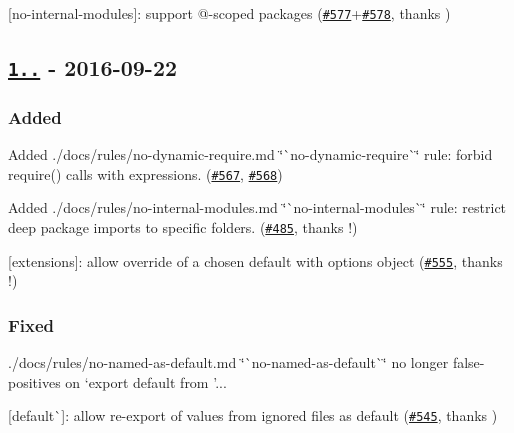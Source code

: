 \begin{DoxyItemize}
\item \mbox{[}{\ttfamily no-\/internal-\/modules}\mbox{]}\+: support {\ttfamily @}-\/scoped packages (\href{https://github.com/benmosher/eslint-plugin-import/issues/577}{\tt \#577}+\href{https://github.com/benmosher/eslint-plugin-import/pull/578}{\tt \#578}, thanks \href{https://github.com/spalger}{\tt })
\end{DoxyItemize}

\subsection*{\href{https://github.com/benmosher/eslint-plugin-import/compare/v1.15.0...v1.16.0}{\tt 1..} -\/ 2016-\/09-\/22}

\subsubsection*{Added}


\begin{DoxyItemize}
\item Added ./docs/rules/no-\/dynamic-\/require.md \char`\"{}\`{}no-\/dynamic-\/require\`{}\char`\"{} rule\+: forbid {\ttfamily require()} calls with expressions. (\href{https://github.com/benmosher/eslint-plugin-import/issues/567}{\tt \#567}, \href{https://github.com/benmosher/eslint-plugin-import/pull/568}{\tt \#568})
\item Added ./docs/rules/no-\/internal-\/modules.md \char`\"{}\`{}no-\/internal-\/modules\`{}\char`\"{} rule\+: restrict deep package imports to specific folders. (\href{https://github.com/benmosher/eslint-plugin-import/pull/485}{\tt \#485}, thanks \href{https://github.com/spalger}{\tt }!)
\item \mbox{[}{\ttfamily extensions}\mbox{]}\+: allow override of a chosen default with options object (\href{https://github.com/benmosher/eslint-plugin-import/pull/555}{\tt \#555}, thanks \href{https://github.com/ljharb}{\tt }!)
\end{DoxyItemize}

\subsubsection*{Fixed}


\begin{DoxyItemize}
\item ./docs/rules/no-\/named-\/as-\/default.md \char`\"{}\`{}no-\/named-\/as-\/default\`{}\char`\"{} no longer false-\/positives on `export default from '...
\item {\ttfamily \mbox{[}}default\`{}\mbox{]}\+: allow re-\/export of values from ignored files as default (\href{https://github.com/benmosher/eslint-plugin-import/issues/545}{\tt \#545}, thanks \href{https://github.com/skyrpex}{\tt })
\end{DoxyItemize}

